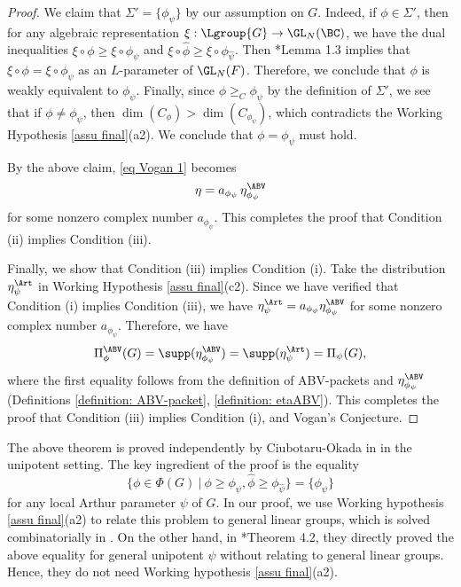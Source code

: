 \documentclass[11pt,letterpaper]{amsart}
\numberwithin{equation}{section}
\begin{document}
\begin{proof}
We claim that $\Sigma'=\{\phi_{\psi}\}$ by our assumption on $G$. Indeed, if $\phi \in \Sigma'$, then for any algebraic representation $\xi: \Lgroup{G} \to \GL_N(\BC)$, we have the dual inequalities $\xi \circ \phi \geq \xi \circ \phi_{\psi}$ and $\xi \circ \widehat{\phi} \geq \xi \circ \phi_{\widehat{\psi}}$. Then \cite{Lo24}*{Lemma 1.3} implies that $\xi\circ \phi= \xi \circ \phi_{\psi}$ as an $L$-parameter of $\GL_N(F)$. Therefore, we conclude that $\phi$ is weakly equivalent to $\phi_{\psi}$. Finally, since $\phi \geq_{C} \phi_{\psi}$ by the definition of $\Sigma'$, we see that if $ \phi \neq \phi_{\psi}$, then $\dim(C_{\phi})> \dim(C_{\phi_{\psi}})$, which contradicts the Working Hypothesis \ref{assu final}(a2). We conclude that $\phi=\phi_{\psi}$ must hold. 

By the above claim, \eqref{eq Vogan 1} becomes 
\[ \eta= a_{\phi_{\psi}}\,  \eta_{\phi_{\psi}}^{\ABV}\]
for some nonzero complex number $a_{\phi_{\psi}}$. This completes the proof that Condition (ii) implies Condition (iii).

Finally, we show that Condition (iii) implies Condition (i). Take the distribution $\eta_{\psi}^{\Art}$ in Working Hypothesis \ref{assu final}(c2). Since we have verified that Condition (i) implies Condition (iii), we have $\eta_{\psi}^{\Art}= a_{\phi_{\psi}} \eta_{\phi_{\psi}}^{\ABV}$ for some  nonzero complex number $a_{\phi_{\psi}}$. 
 Therefore, we have
\[ \Pi_{\phi}^{\ABV}(G)= \supp( \eta_{\phi_{\psi}}^{\ABV}) =\supp( \eta_{\psi}^{\Art})= \Pi_{\psi}(G),\]
where the first equality follows from the definition of ABV-packets and $\eta_{\phi_{\psi}}^{\ABV}$ (Definitions \ref{definition: ABV-packet}, \ref{definition: etaABV}).
This completes the proof that Condition (iii) implies Condition (i), and Vogan's Conjecture.
\end{proof}

\begin{remark}\label{rmk CO26}
The above theorem is proved independently by Ciubotaru-Okada in \cite{CO26} in the unipotent setting. The key ingredient of the proof is the equality
\[ \{ \phi\in \Phi(G)\ | \ \phi\geq \phi_{\psi}, \widehat{\phi} \geq \phi_{\widehat{\psi}} \}= \{\phi_{\psi}\} \]
for any local Arthur parameter $\psi$ of $G$. In our proof, we use Working hypothesis \ref{assu final}(a2) to relate this problem to general linear groups, which is solved combinatorially in \cite{Lo24}. On the other hand, in \cite{CO26}*{Theorem 4.2}, they directly proved the above equality for general unipotent $\psi$ without relating to general linear groups. Hence, they do not need Working hypothesis \ref{assu final}(a2).
\end{remark}
\end{document}
